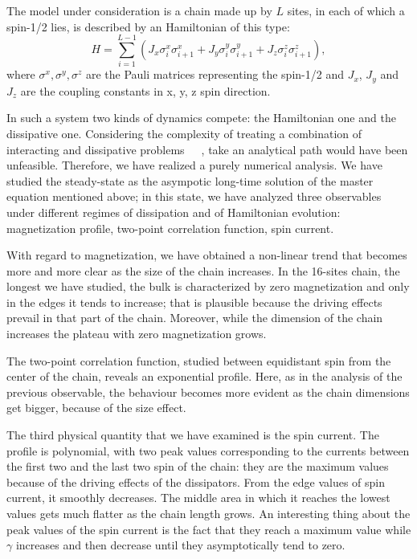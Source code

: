 \documentclass[12pt]{extarticle}
\begin{document}

The model under consideration is a chain made up by $L$ sites, in each of which a spin-1/2 lies, is described by an Hamiltonian of this type:
\begin{equation*}
    H = \sum_{i = 1}^{L-1} (J_x\sigma_i^x\sigma_{i+1}^x + J_y\sigma_i^y \sigma_{i+1}^y + J_z \sigma_i^z \sigma_{i+1}^z),
\end{equation*}
where $\sigma^x, \sigma^y, \sigma^z$ are the Pauli matrices representing the spin-1/2 and $J_x$, $J_y$ and $J_z$ are the coupling constants in x, y, z spin direction.

In such a system two kinds of dynamics compete: the Hamiltonian one and the dissipative one. Considering the complexity of treating a combination of interacting and dissipative problems~\cite{savona}~\cite{Lee_Haffner_Cross}~\cite{phase_trans_spin_system}, take an analytical path would have been unfeasible. Therefore, we have realized a purely numerical analysis. We have studied the steady-state as the asympotic long-time solution of the master equation mentioned above; in this state, we have analyzed three observables under different regimes of dissipation and of Hamiltonian evolution: magnetization profile, two-point correlation function, spin current. 

With regard to magnetization, we have obtained a non-linear trend that becomes more and more clear as the size of the chain increases. In the 16-sites chain, the longest we have studied, the bulk is characterized by zero magnetization and only in the edges it tends to increase; that is plausible because the driving effects prevail in that part of the chain. Moreover, while the dimension of the chain increases the plateau with zero magnetization grows. 

The two-point correlation function, studied between equidistant spin from the center of the chain, reveals an exponential profile. Here, as in the analysis of the previous observable, the behaviour becomes more evident as the chain dimensions get bigger, because of the size effect.

The third physical quantity that we have examined is the spin current. The profile is polynomial, with two peak values corresponding to the currents between the first two and the last two spin of the chain: they are the maximum values because of the driving effects of the dissipators. From the edge values of spin current, it smoothly decreases. The middle area in which it reaches the lowest values gets much flatter as the chain length grows. An interesting thing about the peak values of the spin current is the fact that they reach a maximum value while $\gamma$ increases and then decrease until they  asymptotically tend to zero.
\end{document}
